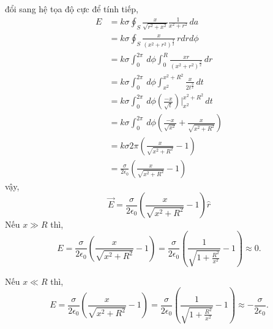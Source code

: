 đổi sang hệ tọa độ cực để tính tiếp,
\begin{align*}
    E &= k\sigma \oint_{S} \frac{x}{\sqrt{r^2 + x^2}} \frac{1}{x^2 + r^2} \, da\\[6pt]
     &= k\sigma \oint_{S} \frac{x}{(x^2 + r^2)^{\frac{3}{2}}} \, rdrd\phi\\[6pt]
     &= k\sigma \int_{0}^{2\pi} \, d\phi \int_{0}^{R} \frac{xr}{(x^2 + r^2)^{\frac{3}{2}}} \, dr\\[6pt]
     &= k\sigma \int_{0}^{2\pi} \, d\phi \int_{x^2}^{x^2 + R^2} \frac{x}{2t^{\frac{3}{2}}} \, dt\\[6pt]
     &= k\sigma \int_{0}^{2\pi} \, d\phi (\frac{-x}{\sqrt{t}})\Big|_{x^2}^{x^2+R^2} \, dt\\[6pt]
     &= k\sigma \int_{0}^{2\pi} \, d\phi (\frac{-x}{\sqrt{x^2}} + \frac{x}{\sqrt{x^2+R^2}}) \\[6pt]
     &= k\sigma 2\pi (\frac{x}{\sqrt{x^2+R^2}} -1) \\[6pt]
     &= \frac{\sigma}{2\epsilon_{0}} (\frac{x}{\sqrt{x^2+R^2}} -1)
\end{align*}
vậy,
\[
\boxed{\vec{E}= \frac{\sigma}{2\epsilon_{0}} (\frac{x}{\sqrt{x^2+R^2}} -1)\hat{r}}
\]
Nếu $x \gg R$ thì,
\[
E = \frac{\sigma}{2\epsilon_{0}}
\left(
\frac{x}{\sqrt{x^2+R^2}} - 1
\right)
=
\frac{\sigma}{2\epsilon_{0}}
\left(
\frac{1}{\sqrt{1+\frac{R^2}{x^2}}} - 1
\right)
\approx 0.
\]

Nếu $x \ll R$ thì,
\[
E = \frac{\sigma}{2\epsilon_{0}}
\left(
\frac{x}{\sqrt{x^2+R^2}} - 1
\right)
=
\frac{\sigma}{2\epsilon_{0}}
\left(
\frac{1}{\sqrt{1+\frac{R^2}{x^2}}} - 1
\right)
\approx -\frac{\sigma}{2\epsilon_{0}}.
\]
